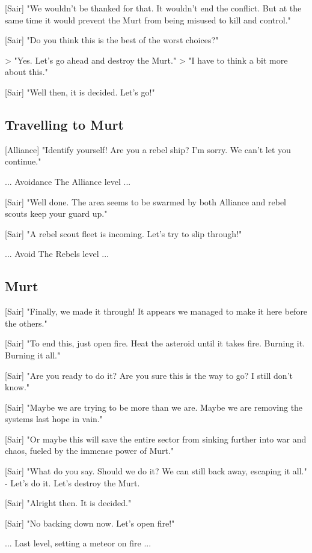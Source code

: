 \documentclass[a4paper,12pt]{article}
\begin{document}
[Sair] "We wouldn't be thanked for that. It wouldn't end the conflict. But at the same time it would prevent the Murt
from being misused to kill and control."

[Sair] "Do you think this is the best of the worst choices?"

> "Yes. Let's go ahead and destroy the Murt."
> "I have to think a bit more about this."

[Sair] "Well then, it is decided. Let's go!"

\subsection{Travelling to Murt}

[Alliance] "Identify yourself! Are you a rebel ship? I'm sorry. We can't let you continue."

... Avoidance The Alliance level ...

[Sair] "Well done. The area seems to be swarmed by both Alliance and rebel scouts keep your guard up."

[Sair] "A rebel scout fleet is incoming. Let's try to slip through!"

... Avoid The Rebels level ...

\subsection{Murt}

[Sair] "Finally, we made it through! It appears we managed to make it here before the others."

[Sair] "To end this, just open fire. Heat the asteroid until it takes fire. Burning it. Burning it all."

[Sair] "Are you ready to do it? Are you sure this is the way to go? I still don't know."

[Sair] "Maybe we are trying to be more than we are. Maybe we are removing the systems last hope in vain."

[Sair] "Or maybe this will save the entire sector from sinking further into war and chaos, fueled by the immense power
of Murt."

[Sair] "What do you say. Should we do it? We can still back away, escaping it all."
- Let's do it. Let's destroy the Murt.

[Sair] "Alright then. It is decided."

[Sair] "No backing down now. Let's open fire!"

... Last level, setting a meteor on fire ...
\end{document}
